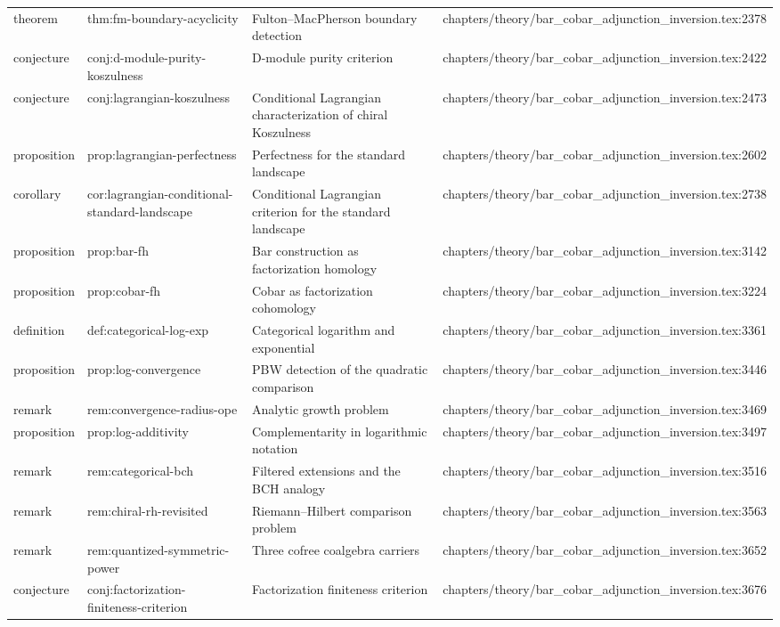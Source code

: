 \documentclass[11pt]{article}
\begin{document}
\begin{longtable}{L{0.10\textwidth}L{0.26\textwidth}L{0.42\textwidth}L{0.22\textwidth}}
theorem & thm:fm-boundary-acyclicity & Fulton--MacPherson boundary detection & chapters/theory/bar\_cobar\_adjunction\_inversion.tex:2378\\
conjecture & conj:d-module-purity-koszulness & D-module purity criterion & chapters/theory/bar\_cobar\_adjunction\_inversion.tex:2422\\
conjecture & conj:lagrangian-koszulness & Cond{}itional Lagrangian characterization of chiral Koszulness & chapters/theory/bar\_cobar\_adjunction\_inversion.tex:2473\\
proposition & prop:lagrangian-perfectness & Perfectness for the standard landscape & chapters/theory/bar\_cobar\_adjunction\_inversion.tex:2602\\
corollary & cor:lagrangian-cond{}itional-standard-landscape & Cond{}itional Lagrangian criterion for the standard landscape & chapters/theory/bar\_cobar\_adjunction\_inversion.tex:2738\\
proposition & prop:bar-fh & Bar construction as factorization homology & chapters/theory/bar\_cobar\_adjunction\_inversion.tex:3142\\
proposition & prop:cobar-fh & Cobar as factorization cohomology & chapters/theory/bar\_cobar\_adjunction\_inversion.tex:3224\\
definition & def:categorical-log-exp & Categorical logarithm and exponential & chapters/theory/bar\_cobar\_adjunction\_inversion.tex:3361\\
proposition & prop:log-convergence & PBW detection of the quadratic comparison & chapters/theory/bar\_cobar\_adjunction\_inversion.tex:3446\\
remark & rem:convergence-radius-ope & Analytic growth problem & chapters/theory/bar\_cobar\_adjunction\_inversion.tex:3469\\
proposition & prop:log-additivity & Complementarity in logarithmic notation & chapters/theory/bar\_cobar\_adjunction\_inversion.tex:3497\\
remark & rem:categorical-bch & Filtered extensions and the BCH analogy & chapters/theory/bar\_cobar\_adjunction\_inversion.tex:3516\\
remark & rem:chiral-rh-revisited & Riemann--Hilbert comparison problem & chapters/theory/bar\_cobar\_adjunction\_inversion.tex:3563\\
remark & rem:quantized-symmetric-power & Three cofree coalgebra carriers & chapters/theory/bar\_cobar\_adjunction\_inversion.tex:3652\\
conjecture & conj:factorization-finiteness-criterion & Factorization finiteness criterion & chapters/theory/bar\_cobar\_adjunction\_inversion.tex:3676\\

\end{longtable}
\end{document}
